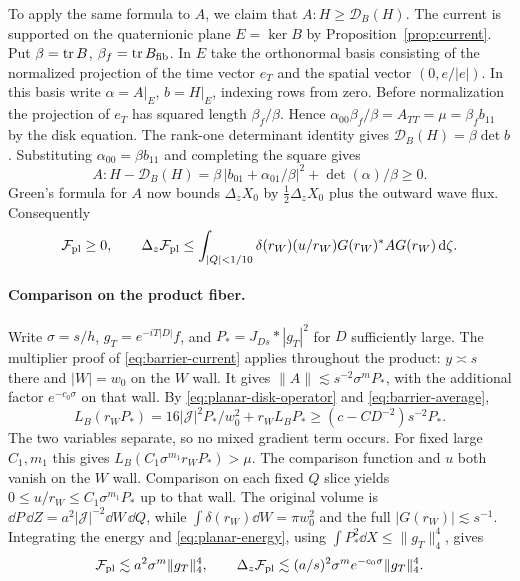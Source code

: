 To apply the same formula to $A$, we claim that $A:H\ge\mathcal D_B(H)$.
The current is supported on the quaternionic plane $E=\ker B$ by
Proposition~\ref{prop:current}. Put $\beta=\operatorname{tr} B$, $\beta_f=\operatorname{tr} B_{\rm fib}$.
In $E$ take the orthonormal basis consisting of the normalized projection
of the time vector $e_T$ and the spatial vector $(0,e/|e|)$. In this
basis write $\alpha=A|_E$, $b=H|_E$, indexing rows from zero. Before
normalization the projection of $e_T$ has squared length $\beta_f/\beta$. Hence
$\alpha_{00}\beta_f/\beta=A_{TT}=\mu=\beta_f b_{11}$ by the disk
equation. The rank-one determinant identity gives
$\mathcal D_B(H)=\beta\det b$. Substituting
$\alpha_{00}=\beta b_{11}$ and completing the square gives
\[
 A:H-\mathcal D_B(H)
   =\beta\,|b_{01}+\alpha_{01}/\beta|^2+\det(\alpha)/\beta\ge0.
\]
Green's formula for $A$ now bounds
$\Delta_zX_0$ by $\tfrac12\Delta_zX_0$ plus the outward wave flux.
Consequently
\begin{equation}\label{eq:planar-energy}
 \mathcal F_{\rm pl}\ge0,\qquad
 \Delta_z\mathcal F_{\rm pl}\le
 \int_{|Q|<1/10}\delta(r_W)(u/r_W)G(r_W)^*A G(r_W)\,\mathrm d\zeta .
\end{equation}

\paragraph{Comparison on the product fiber.}
Write $\sigma=s/h$, $g_T=e^{-iT|D|}f$, and
$P_*=J_{Ds}*|g_T|^2$ for $D$ sufficiently large.
The multiplier proof of \eqref{eq:barrier-current} applies throughout
the product: $y\asymp s$ there and $|W|=w_0$ on the $W$ wall. It
gives $\|A\|\lesssim s^{-2}\sigma^m P_*$, with the additional factor
$e^{-c_0\sigma}$ on that wall. By \eqref{eq:planar-disk-operator} and
\eqref{eq:barrier-average},
\[
 L_B(r_WP_*)=16|\mathcal J|^2P_*/w_0^2+r_W L_BP_*
       \ge(c-CD^{-2})s^{-2}P_* .
\]
The two variables separate, so no mixed gradient term occurs.
For fixed large $C_1,m_1$ this gives $L_B(C_1\sigma^{m_1}r_WP_*)>\mu$.
The comparison function and $u$ both vanish on the $W$ wall.
Comparison on each fixed $Q$ slice yields $0\le u/r_W\le C_1\sigma^{m_1}P_*$ up to that wall.
The original volume is $\dd P\,\dd Z=a^2|\mathcal J|^{-2}\dd W\,\dd Q$,
while $\int\delta(r_W)\dd W=\pi w_0^2$ and the full $|G(r_W)|\lesssim s^{-1}$.
Integrating the energy and
\eqref{eq:planar-energy}, using $\int P_*^2\dd X\le\|g_T\|_4^4$, gives
\[
 \mathcal F_{\rm pl}\lesssim a^2\sigma^m\|g_T\|_4^4,\qquad
 \Delta_z\mathcal F_{\rm pl}\lesssim
       (a/s)^2\sigma^m e^{-c_0\sigma}\|g_T\|_4^4 .
\]

